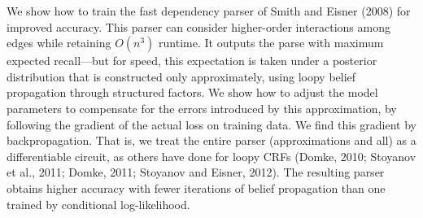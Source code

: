 We show how to train the fast dependency parser of Smith and Eisner (2008) for improved accuracy. This parser can consider higher-order interactions among edges while retaining $O(n^3)$ runtime. It outputs the parse with maximum expected recall—but for speed, this expectation is taken under a posterior distribution that is constructed only approximately, using loopy belief propagation through structured factors. We show how to adjust the model parameters to compensate for the errors introduced by this approximation, by following the gradient of the actual loss on training data. We find this gradient by backpropagation. That is, we treat the entire parser (approximations and all) as a differentiable circuit, as others have done for loopy CRFs (Domke, 2010; Stoyanov et al., 2011; Domke, 2011; Stoyanov and Eisner, 2012). The resulting parser obtains higher accuracy with fewer iterations of belief propagation than one trained by conditional log-likelihood.
